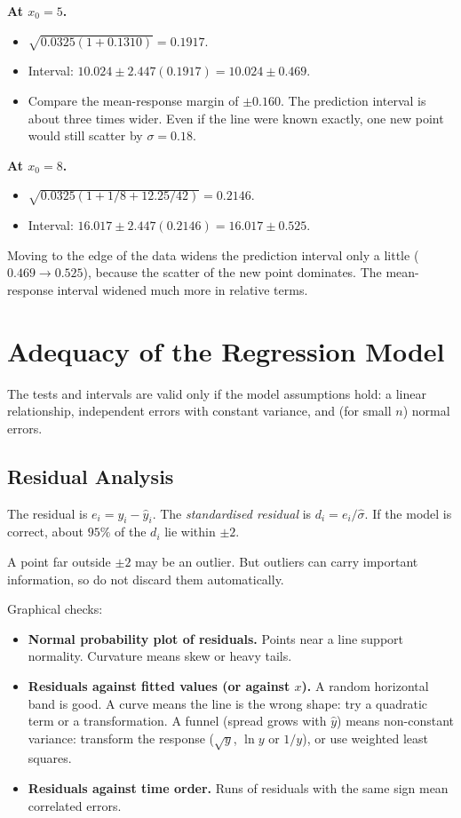 \begin{example}[Prediction at $x_0=5$ and $x_0=8$]
\textbf{At $x_0=5$.}
\begin{itemize}
  \item $\sqrt{0.0325(1+0.1310)}=0.1917$.
  \item Interval: $10.024\pm2.447(0.1917)=10.024\pm0.469$.
  \item Compare the mean-response margin of $\pm0.160$. The prediction interval is about three times wider. Even if the line were known exactly, one new point would still scatter by $\sigma=0.18$.
\end{itemize}

\textbf{At $x_0=8$.}
\begin{itemize}
  \item $\sqrt{0.0325(1+1/8+12.25/42)}=0.2146$.
  \item Interval: $16.017\pm2.447(0.2146)=16.017\pm0.525$.
\end{itemize}
Moving to the edge of the data widens the prediction interval only a little ($0.469\to0.525$), because the scatter of the new point dominates. The mean-response interval widened much more in relative terms.
\end{example}

\section{Adequacy of the Regression Model}

The tests and intervals are valid only if the model assumptions hold: a linear relationship, independent errors with constant variance, and (for small $n$) normal errors.

\subsection{Residual Analysis}

\begin{definition}[Residuals]
The residual is $e_i=y_i-\hat{y}_i$. The \emph{standardised residual} is $d_i=e_i/\hat\sigma$. If the model is correct, about $95\%$ of the $d_i$ lie within $\pm2$.
\end{definition}

A point far outside $\pm2$ may be an outlier. But outliers can carry important information, so do not discard them automatically.

Graphical checks:
\begin{itemize}
  \item \textbf{Normal probability plot of residuals.} Points near a line support normality. Curvature means skew or heavy tails.
  \item \textbf{Residuals against fitted values (or against $x$).} A random horizontal band is good. A curve means the line is the wrong shape: try a quadratic term or a transformation. A funnel (spread grows with $\hat{y}$) means non-constant variance: transform the response ($\sqrt{y}$, $\ln y$ or $1/y$), or use weighted least squares.
  \item \textbf{Residuals against time order.} Runs of residuals with the same sign mean correlated errors.
\end{itemize}


